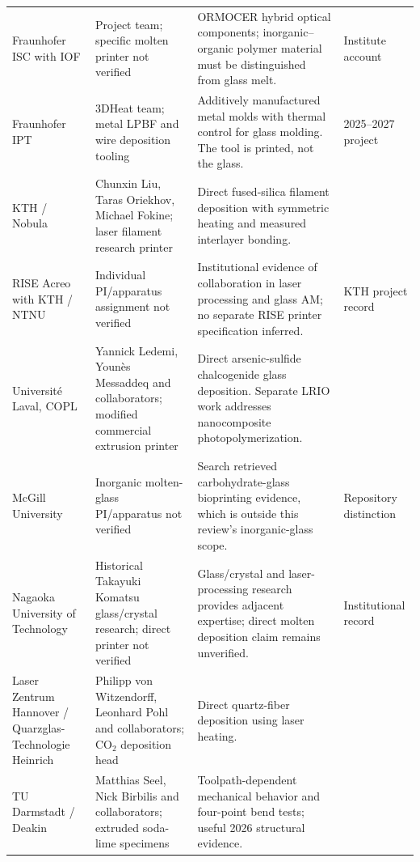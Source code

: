 \begin{longtable}{P{0.18\textwidth}P{0.22\textwidth}P{0.30\textwidth}P{0.20\textwidth}}
Fraunhofer ISC with IOF & Project team; specific molten printer not verified & ORMOCER hybrid optical components; inorganic--organic polymer material must be distinguished from glass melt. & Institute account \cite{acad_isc} \\
Fraunhofer IPT & 3DHeat team; metal LPBF and wire deposition tooling & Additively manufactured metal molds with thermal control for glass molding. The tool is printed, not the glass. & 2025--2027 project \cite{acad_ipt} \\
KTH / Nobula & Chunxin Liu, Taras Oriekhov, Michael Fokine; laser filament research printer & Direct fused-silica filament deposition with symmetric heating and measured interlayer bonding. & \cite{acad_liu2022} \\
RISE Acreo with KTH / NTNU & Individual PI/apparatus assignment not verified & Institutional evidence of collaboration in laser processing and glass AM; no separate RISE printer specification inferred. & KTH project record \cite{acad_kthrise} \\
Universit\'e Laval, COPL & Yannick Ledemi, Youn\`es Messaddeq and collaborators; modified commercial extrusion printer & Direct arsenic-sulfide chalcogenide glass deposition. Separate LRIO work addresses nanocomposite photopolymerization. & \cite{acad_baudet2019,acad_lavalproject} \\
McGill University & Inorganic molten-glass PI/apparatus not verified & Search retrieved carbohydrate-glass bioprinting evidence, which is outside this review's inorganic-glass scope. & Repository distinction \cite{acad_mcgill} \\
Nagaoka University of Technology & Historical Takayuki Komatsu glass/crystal research; direct printer not verified & Glass/crystal and laser-processing research provides adjacent expertise; direct molten deposition claim remains unverified. & Institutional record \cite{acad_nagaoka} \\
Laser Zentrum Hannover / Quarzglas-Technologie Heinrich & Philipp von Witzendorff, Leonhard Pohl and collaborators; CO$_2$ deposition head & Direct quartz-fiber deposition using laser heating. & \cite{acad_witzendorff2018} \\
TU Darmstadt / Deakin & Matthias Seel, Nick Birbilis and collaborators; extruded soda-lime specimens & Toolpath-dependent mechanical behavior and four-point bend tests; useful 2026 structural evidence. & \cite{acad_chhadeh2026} \\
\bottomrule
\end{longtable}

